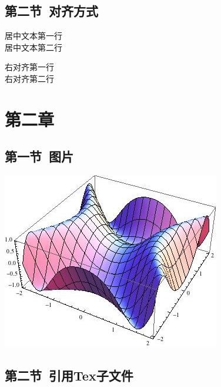 \documentclass{ctexart}
\begin{document}
\subsection{第二节\ 对齐方式}


\begin{center} 
居中文本第一行\\
居中文本第二行\\
\end{center}

\begin{flushright}
右对齐第一行\\
右对齐第二行\\
\end{flushright}





\section{第二章}

\subsection{第一节\ 图片}

\begin{center}
\includegraphics[scale=0.4]{include_picture/picture.jpg}\par
\end{center}

\subsection{第二节\ 引用Tex子文件}
\end{document}
